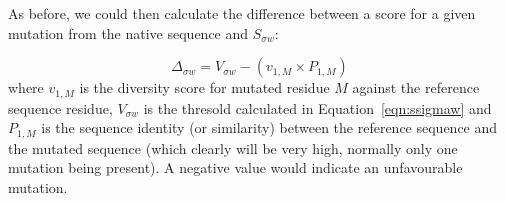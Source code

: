 \documentclass[a4paper]{article}
\begin{document}
As before, we could then calculate the difference between a score for
a given mutation from the native sequence and $S_{\sigma w}$:

\begin{equation}
  \Delta_{\sigma w} = V_{\sigma w} - (v_{1, M} \times P_{1, M})
\end{equation}
where $v_{1,M}$ is the diversity score for mutated residue $M$ against
the reference sequence residue, $V_{\sigma w}$ is the thresold
calculated in Equation~\ref{eqn:ssigmaw} and $P_{1,M}$ is the sequence
identity (or similarity) between the reference sequence and the
mutated sequence (which clearly will be very high, normally only one
mutation being present). A negative value would indicate an
unfavourable mutation.
\end{document}
